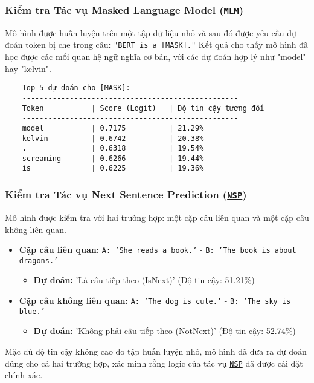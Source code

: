     \subsubsection{Kiểm tra Tác vụ Masked Language Model (\hyperref[acro:mlm]{\texttt{MLM}})}
    Mô hình được huấn luyện trên một tập dữ liệu nhỏ và sau đó được yêu cầu dự đoán token bị che trong câu: \texttt{"BERT is a [MASK]."}
    Kết quả cho thấy mô hình đã học được các mối quan hệ ngữ nghĩa cơ bản, với các dự đoán hợp lý như "model" hay "kelvin".
    
    \begin{verbatim}
    Top 5 dự đoán cho [MASK]:
    --------------------------------------------------
    Token           | Score (Logit)   | Độ tin cậy tương đối
    --------------------------------------------------
    model           | 0.7175          | 21.29%
    kelvin          | 0.6742          | 20.38%
    .               | 0.6318          | 19.54%
    screaming       | 0.6266          | 19.44%
    is              | 0.6225          | 19.36%
    \end{verbatim}
    
    \subsubsection{Kiểm tra Tác vụ Next Sentence Prediction (\hyperref[acro:nsp]{\texttt{NSP}})}
    Mô hình được kiểm tra với hai trường hợp: một cặp câu liên quan và một cặp câu không liên quan.
    \begin{itemize}
        \item \textbf{Cặp câu liên quan:} \texttt{A: 'She reads a book.'} - \texttt{B: 'The book is about dragons.'}
        \begin{itemize}
            \item[] \textbf{Dự đoán:} 'Là câu tiếp theo (IsNext)' (Độ tin cậy: 51.21\%)
        \end{itemize}
        \item \textbf{Cặp câu không liên quan:} \texttt{A: 'The dog is cute.'} - \texttt{B: 'The sky is blue.'}
        \begin{itemize}
            \item[] \textbf{Dự đoán:} 'Không phải câu tiếp theo (NotNext)' (Độ tin cậy: 52.74\%)
        \end{itemize}
    \end{itemize}
    Mặc dù độ tin cậy không cao do tập huấn luyện nhỏ, mô hình đã đưa ra dự đoán đúng cho cả hai trường hợp, xác minh rằng logic của tác vụ \hyperref[acro:nsp]{\texttt{NSP}} đã được cài đặt chính xác.
    
